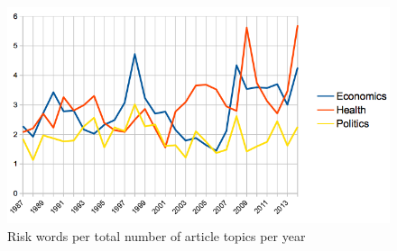             \begin{figure}[htb!]
            \centering
            \includegraphics[width=.70\textwidth]{../images/echepol_riskwords.png}
            \caption{Risk words per total number of article topics per year}
            \label{fig:echepol_riskwords}
            \end{figure}

